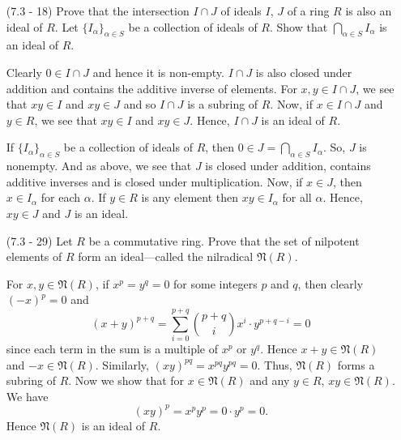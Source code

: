 \documentclass[12pt]{article}
\newcommand{\al}{\alpha}
\newcommand{\nil}{\mathfrak{N}(R)}
\begin{document}
\begin{enumerate}
\item[(7.3 - 18)] Prove that the intersection $I\cap J$
    of ideals $I$, $J$ of a ring $R$ is also an ideal of
    $R$. Let $\{I_\alpha\}_{\alpha\in S}$ be a collection
    of ideals of $R$. Show that $\bigcap_{\alpha\in S}
    {I_\alpha}$ is an ideal of $R$.
\begin{mybox}

    Clearly $0\in I\cap J$ and hence it is non-empty.
    $I\cap J$ is also closed under addition and contains
    the additive inverse of elements.
    For $x,y\in I\cap J$, we see that $xy\in I$ and
    $xy\in J$ and so $I\cap J$ is a subring of $R$.
    Now, if $x\in I\cap J$ and $y\in R$, we see that
    $xy\in I$ and $xy\in J$. Hence, $I\cap J$ is an
    ideal of $R$.

    \vspace*{3mm}
    If $\{I_\alpha\}_{\alpha\in S}$ be a collection
    of ideals of $R$, then $0\in J=\bigcap_{\alpha\in S}
    {I_\alpha}$. So, $J$ is nonempty. And as above, we see
    that $J$ is closed under addition, contains additive
    inverses and is closed under multiplication.
    Now, if $x\in J$, then $x\in I_\al$ for each $\al$.
    If $y\in R$ is any element then $xy\in I_\al$ for
    all $\al$. Hence, $xy\in J$ and $J$ is an ideal.
\end{mybox}

\item[(7.3 - 29)] Let $R$ be a commutative ring. Prove that
    the set of nilpotent elements of
    $R$ form an ideal—called the nilradical $\mathfrak{N}(R)$.
\begin{mybox}
    
    For $x,y\in\nil$, if $x^p=y^q=0$ for some
    integers $p$ and $q$, then
    clearly $(-x)^p=0$ and 
    $$(x+y)^{p+q}=\sum_{i=0}^{p+q}{{p+q\choose i}
    x^i\cdot y^{p+q-i}}=0$$
    since each term in the sum is a multiple of
    $x^p$ or $y^q$. Hence $x+y\in \nil$ and $-x\in\nil$.
    Similarly, $(xy)^{pq}=x^{pq}y^{pq}=0$. Thus,
    $\nil$ forms a subring of $R$. Now we show that for
    $x\in\nil$ and any $y\in R$, $xy\in \nil$.
    We have
    $$(xy)^{p}=x^py^p=0\cdot y^p=0.$$
    Hence $\nil$ is an ideal of $R$.
\end{mybox}

\end{enumerate}
\end{document}
